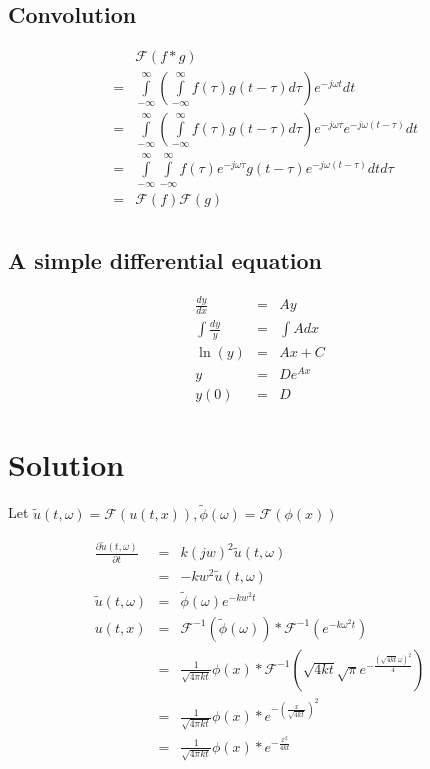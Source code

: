\documentclass{article}
\begin{document}
\subsection*{Convolution}
\begin{eqnarray*}
  & & \mathcal{F}(f * g) \\
  &=& \int\limits_{-\infty}^{\infty}{\left(\int\limits_{-\infty}^{\infty}{f(\tau)g(t - \tau)d \tau}\right)e^{-j\omega t}dt} \\
  &=& \int\limits_{-\infty}^{\infty}{\left(\int\limits_{-\infty}^{\infty}{f(\tau)g(t - \tau)d \tau}\right)e^{-j\omega \tau}e^{-j\omega (t - \tau)}dt} \\
  &=& \int\limits_{-\infty}^{\infty}{\int\limits_{-\infty}^{\infty}{f(\tau)e^{-j\omega \tau}g(t - \tau)e^{-j\omega (t - \tau)}dt d\tau}} \\
  &=& \mathcal{F}(f) \mathcal{F}(g) \\
\end{eqnarray*}

\subsection*{A simple differential equation}
\begin{eqnarray*}
     \frac{dy}{dx} &=& Ay        \\
  \int\frac{dy}{y} &=& \int{Adx} \\
           \ln(y) &=& Ax + C     \\
                y &=& De^{Ax}    \\
             y(0) &=& D
\end{eqnarray*}

\section*{Solution}
Let $ \tilde{u}(t, \omega) = \mathcal{F}(u(t, x)) , \tilde{\phi}(\omega) = \mathcal{F}(\phi(x)) $

\begin{eqnarray*}
  \frac{\partial \tilde{u}(t, \omega)}{\partial t} &=& k(jw)^2\tilde{u}(t, \omega) \\
                                                   &=& -kw^2\tilde{u}(t, \omega)  \\
  \tilde{u}(t, \omega) &=& \tilde{\phi}(\omega)e^{-kw^2t}  \\
       u(t, x) &=& \mathcal{F}^{-1} (\tilde{\phi}(\omega)) * \mathcal{F}^{-1} (e^{-k \omega^2t}) \\
               &=& \frac{1}{\sqrt{4\pi kt}} \phi(x) * \mathcal{F}^{-1}\left(\sqrt{4kt}\sqrt{\pi}e^{-\frac{(\sqrt{4kt}\omega)^2}{4}}\right) \\
               &=& \frac{1}{\sqrt{4\pi kt}} \phi(x) * e^{-\left(\frac{x}{\sqrt{4kt}}\right)^2} \\
               &=& \frac{1}{\sqrt{4\pi kt}} \phi(x) * e^{-\frac{x^2}{4kt}} \\
\end{eqnarray*}
\end{document}
